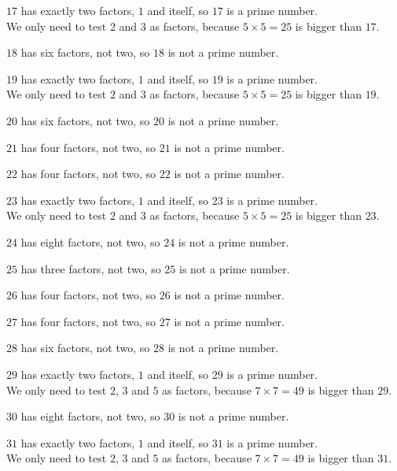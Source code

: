 \documentclass[aspectratio=169]{beamer}
\begin{document}
  {$17$ has exactly two factors, $1$ and itself, so $17$ is a prime number.\\[0.45em]We only need to test $2$ and $3$ as factors, because $5\times 5=25$ is bigger than $17$.}

  {$18$ has six factors, not two, so $18$ is not a prime number.}

  {$19$ has exactly two factors, $1$ and itself, so $19$ is a prime number.\\[0.45em]We only need to test $2$ and $3$ as factors, because $5\times 5=25$ is bigger than $19$.}

  {$20$ has six factors, not two, so $20$ is not a prime number.}

  {$21$ has four factors, not two, so $21$ is not a prime number.}

  {$22$ has four factors, not two, so $22$ is not a prime number.}

  {$23$ has exactly two factors, $1$ and itself, so $23$ is a prime number.\\[0.45em]We only need to test $2$ and $3$ as factors, because $5\times 5=25$ is bigger than $23$.}

  {$24$ has eight factors, not two, so $24$ is not a prime number.}

  {$25$ has three factors, not two, so $25$ is not a prime number.}

  {$26$ has four factors, not two, so $26$ is not a prime number.}

  {$27$ has four factors, not two, so $27$ is not a prime number.}

  {$28$ has six factors, not two, so $28$ is not a prime number.}

  {$29$ has exactly two factors, $1$ and itself, so $29$ is a prime number.\\[0.45em]We only need to test $2$, $3$ and $5$ as factors, because $7\times 7=49$ is bigger than $29$.}

  {$30$ has eight factors, not two, so $30$ is not a prime number.}

  {$31$ has exactly two factors, $1$ and itself, so $31$ is a prime number.\\[0.45em]We only need to test $2$, $3$ and $5$ as factors, because $7\times 7=49$ is bigger than $31$.}
\end{document}

